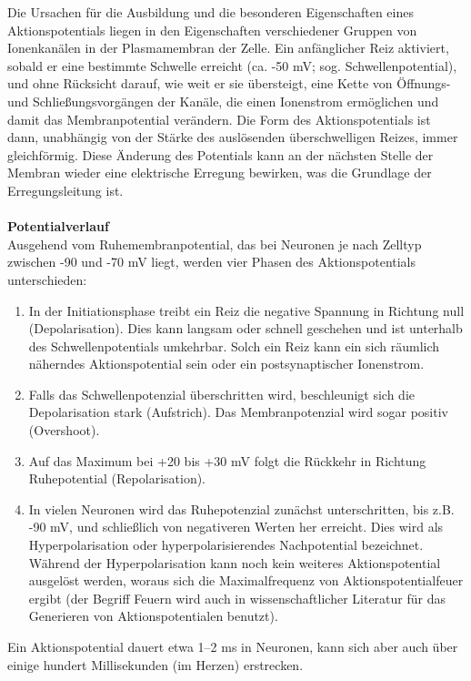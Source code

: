 Die Ursachen für die Ausbildung und die besonderen Eigenschaften eines Aktionspotentials liegen in den Eigenschaften verschiedener Gruppen von Ionenkanälen in der Plasmamembran der Zelle. Ein anfänglicher Reiz aktiviert, sobald er eine bestimmte Schwelle erreicht (ca. -50 mV; sog. Schwellenpotential), und ohne Rücksicht darauf, wie weit er sie übersteigt, eine Kette von Öffnungs- und Schließungsvorgängen der Kanäle, die einen Ionenstrom ermöglichen und damit das Membranpotential verändern. Die Form des Aktionspotentials ist dann, unabhängig von der Stärke des auslösenden überschwelligen Reizes, immer gleichförmig. Diese Änderung des Potentials kann an der nächsten Stelle der Membran wieder eine elektrische Erregung bewirken, was die Grundlage der Erregungsleitung ist.
\\\\
\textbf{Potentialverlauf}\\
Ausgehend vom Ruhemembranpotential, das bei Neuronen je nach Zelltyp zwischen -90 und -70 mV liegt, werden vier Phasen des Aktionspotentials unterschieden:
\begin{enumerate}
	\item In der Initiationsphase treibt ein Reiz die negative Spannung in Richtung null (Depolarisation). Dies kann langsam oder schnell geschehen und ist unterhalb des Schwellenpotentials umkehrbar. Solch ein Reiz kann ein sich räumlich näherndes Aktionspotential sein oder ein postsynaptischer Ionenstrom.
	\item Falls das Schwellenpotenzial überschritten wird, beschleunigt sich die Depolarisation stark (Aufstrich). Das Membranpotenzial wird sogar positiv (Overshoot).
	\item Auf das Maximum bei +20 bis +30 mV folgt die Rückkehr in Richtung Ruhepotential (Repolarisation).
	\item In vielen Neuronen wird das Ruhepotenzial zunächst unterschritten, bis z.B. -90 mV, und schließlich von negativeren Werten her erreicht. Dies wird als Hyperpolarisation oder hyperpolarisierendes Nachpotential bezeichnet. Während der Hyperpolarisation kann noch kein weiteres Aktionspotential ausgelöst werden, woraus sich die Maximalfrequenz von Aktionspotentialfeuer ergibt (der Begriff Feuern wird auch in wissenschaftlicher Literatur für das Generieren von Aktionspotentialen benutzt).
\end{enumerate}

Ein Aktionspotential dauert etwa 1–2 ms in Neuronen, kann sich aber auch über einige hundert Millisekunden (im Herzen) erstrecken.

